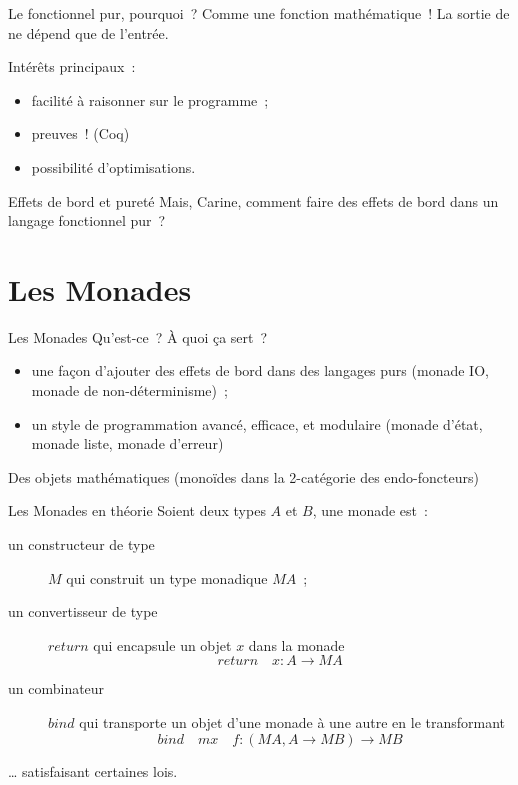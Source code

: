 \documentclass[10pt]{beamer}
\begin{document}
\begin{frame}{Le fonctionnel pur, pourquoi~?}
  Comme une fonction mathématique~! La sortie de ne dépend que de
  l'entrée.

  Intérêts principaux~:
  \begin{itemize}
  \item facilité à raisonner sur le programme~;
  \item preuves~! (Coq)
  \item possibilité d'optimisations.
  \end{itemize}
\end{frame}

\begin{frame}{Effets de bord et pureté}
  Mais, Carine, comment faire des effets de bord dans un langage
  fonctionnel pur~?
\end{frame}

\section{Les Monades}

\begin{frame}{Les Monades}
  Qu'est-ce~? À quoi ça sert~?
  \begin{itemize}
  \item une façon d’ajouter des effets de bord dans des langages purs
    (monade IO, monade de non-déterminisme)~;
  \item un style de programmation avancé, efficace, et modulaire
    (monade d'état, monade liste, monade d'erreur)
  \end{itemize}

  Des objets mathématiques (monoïdes dans la 2-catégorie des
  endo-foncteurs)
\end{frame}

\begin{frame}{Les Monades en théorie}
  Soient deux types $A$ et $B$, une monade est~:
  \begin{description}
  \item[un constructeur de type] $M$ qui construit un type monadique
    $M A$~;
  \item[un convertisseur de type]
    $return$ qui encapsule un objet $x$ dans la monade
    \[ return\quad x : A \to M A \]
  \item[un combinateur] $bind$ qui transporte un objet d'une monade à
    une autre en le transformant
    \[ bind\quad mx\quad f : (M A, A \to M B) \to M B \]
  \end{description}
  … satisfaisant certaines lois.
\end{frame}
\end{document}

